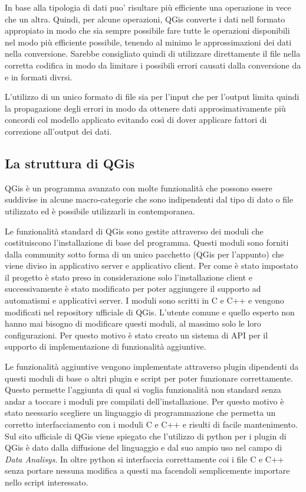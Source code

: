 In base alla tipologia di dati puo' risultare più efficiente una operazione in vece che un altra.
Quindi, per alcune operazioni, QGis converte i dati nell formato appropiato in modo che sia sempre possibile fare tutte le operazioni disponibili nel modo più efficiente possibile, tenendo al minimo le approssimazioni dei dati nella conversione. Sarebbe consigliato quindi di utilizzare direttamente il file nella corretta codifica in modo da limitare i possibili errori causati dalla conversione da e in formati divrsi.

L'utilizzo di un unico formato di file sia per l'input che per l'output limita quindi la propagazione degli errori in modo da ottenere dati approsimativamente più concordi col modello applicato evitando così di dover applicare fattori di correzione all'output dei dati.

\subsection{La struttura di QGis}
QGis è un programma avanzato con molte funzionalità che possono essere suddivise in alcune macro-categorie che sono indipendenti dal tipo di dato o file utilizzato ed è possibile utilizzarli in contemporanea.


Le funzionalità standard di QGis sono gestite attraverso dei moduli che costituiscono l'installazione di base del programma. Questi moduli sono forniti dalla community sotto forma di un unico pacchetto (QGis per l'appunto) che viene diviso in applicativo server e applicativo client. Per come è stato impostato il progetto è stato preso in considerazione solo l'installazione client e successivamente è stato modificato per poter aggiungere il supporto ad automatismi e applicativi server. I moduli sono scritti in C e C++ e vengono modificati nel repository ufficiale di QGis. L'utente comune e quello esperto non hanno mai bisogno di modificare questi moduli, al massimo solo le loro configurazioni. Per questo motivo è stato creato un sistema di API per il supporto di implementazione di funzionalità aggiuntive.

Le funzionalità aggiuntive vengono implementate attraverso plugin dipendenti da questi moduli di base o altri plugin e script per poter funzionare correttamente. Questo permette l'aggiunta di qual si voglia funzionalità non standard senza andar a toccare i moduli pre compilati dell'installazione.
Per questo motivo è stato neessario scegliere un linguaggio di programmazione che permetta un corretto interfacciamento con i moduli C e C++ e risulti di facile mantenimento. Sul sito ufficiale di QGis \cite{site:qgis} viene spiegato che l'utilizzo di python per i plugin di QGis è dato dalla diffusione del linguaggio e dal suo ampio uso nel campo di \textit{Data Analisys}. In oltre python si interfaccia correttamente coi i file C e C++ senza portare nessuna modifica a questi ma facendoli semplicemente importare nello script interessato.

